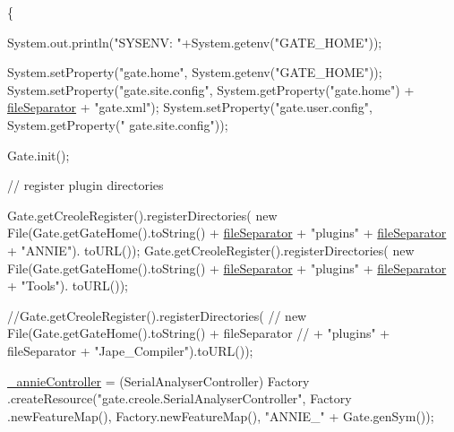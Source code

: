\begin{DoxyCode}
                                                                              \{

        System.out.println(\textcolor{stringliteral}{"SYSENV: "}+System.getenv(\textcolor{stringliteral}{"GATE\_HOME"}));

        System.setProperty(\textcolor{stringliteral}{"gate.home"}, System.getenv(\textcolor{stringliteral}{"GATE\_HOME"}));
        System.setProperty(\textcolor{stringliteral}{"gate.site.config"}, System.getProperty(\textcolor{stringliteral}{"gate.home"})
                + \hyperlink{class_h_l_t_tutorial_ac4f6995f0d67d0bfdd60d26dd7703db5}{fileSeparator} + \textcolor{stringliteral}{"gate.xml"});
        System.setProperty(\textcolor{stringliteral}{"gate.user.config"}, System.getProperty(\textcolor{stringliteral}{"
      gate.site.config"}));

        Gate.init();






        \textcolor{comment}{// register plugin directories}

        Gate.getCreoleRegister().registerDirectories(
                \textcolor{keyword}{new} File(Gate.getGateHome().toString() + \hyperlink{class_h_l_t_tutorial_ac4f6995f0d67d0bfdd60d26dd7703db5}{fileSeparator}
                        + \textcolor{stringliteral}{"plugins"} + \hyperlink{class_h_l_t_tutorial_ac4f6995f0d67d0bfdd60d26dd7703db5}{fileSeparator} + \textcolor{stringliteral}{"ANNIE"}).
      toURL());
        Gate.getCreoleRegister().registerDirectories(
                \textcolor{keyword}{new} File(Gate.getGateHome().toString() + \hyperlink{class_h_l_t_tutorial_ac4f6995f0d67d0bfdd60d26dd7703db5}{fileSeparator}
                        + \textcolor{stringliteral}{"plugins"} + \hyperlink{class_h_l_t_tutorial_ac4f6995f0d67d0bfdd60d26dd7703db5}{fileSeparator} + \textcolor{stringliteral}{"Tools"}).
      toURL());

        \textcolor{comment}{//Gate.getCreoleRegister().registerDirectories(}
        \textcolor{comment}{//  new File(Gate.getGateHome().toString() + fileSeparator}
        \textcolor{comment}{//          + "plugins" + fileSeparator + "Jape\_Compiler").toURL());}

        \hyperlink{class_h_l_t_tutorial_ae3ecde0fc3f5486e117de53e615058ca}{\_annieController} = (SerialAnalyserController) Factory
        .createResource(\textcolor{stringliteral}{"gate.creole.SerialAnalyserController"}, Factory
                .newFeatureMap(), Factory.newFeatureMap(), \textcolor{stringliteral}{"ANNIE\_"}
                + Gate.genSym());


\end{DoxyCode}

